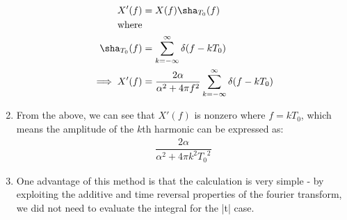 \documentclass[12pt]{article}
\begin{document}
\begin{enumerate}
{ \begin{align*}
X'(f) &= X(f)\sha_{T_0}(f) \\
\text{where} \\
\sha_{T_0}(f) &= \sum_{k=-\infty}^{\infty} \delta(f - k{T_0}) \\
\implies X'(f) &= \dfrac{2\alpha}{\alpha^2 + 4\pi f^2}  \sum_{k=-\infty}^{\infty} \delta(f - k{T_0})
\end{align*}
}
\item{
From the above, we can see that $X'(f)$ is nonzero where $f = kT_0$, which means the amplitude of the $k$th harmonic can be expressed as:
\begin{align*}
\dfrac{2\alpha}{\alpha^2 + 4\pi k^2{T_0}^2}
\end{align*}
}
\item{
One advantage of this method is that the calculation is very simple - by exploiting the additive and time reversal properties of the fourier transform, we did not need to evaluate the integral for the |t| case.
}

\end{enumerate}
\end{document}
